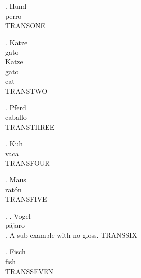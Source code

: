 

\ex. \gll Hund \\ perro \\
\glt TRANSONE

\ex. \gll Katze \\ gato \\
\glll Katze \\ gato \\ cat \\
\glt TRANSTWO

\ex. 
\gll Pferd \\ caballo \\
\glt TRANSTHREE

\ex. \gll Kuh \\ vaca \\
\glt TRANSFOUR

\GlossTransLang{}
\ex. \gll Maus \\ ratón \\
\glt TRANSFIVE

\ex. \a. \gll Vogel \\ pájaro \\
\b. A sub-example with no gloss.
\glt TRANSSIX

\ex. 
\gll Fisch \\ fish \\
\glt TRANSSEVEN



